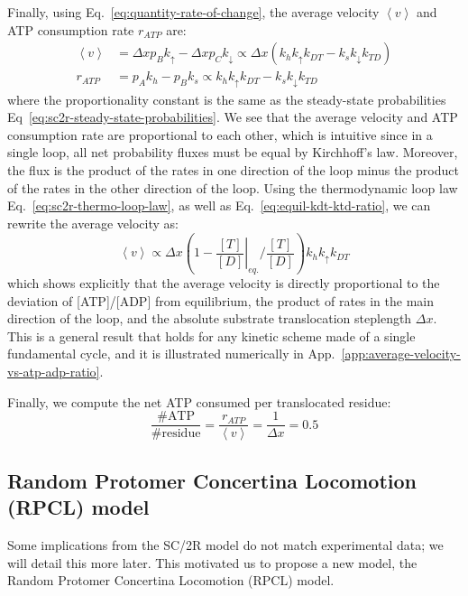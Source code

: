     Finally, using Eq.~\eqref{eq:quantity-rate-of-change}, the average velocity $\left\langle v \right\rangle$ and ATP consumption rate $r_{ATP}$ are:
    \begin{equation}
    \begin{split}
        \left\langle v \right\rangle &= \Delta x p_B k_\uparrow - \Delta x p_C k_\downarrow 
            \propto \Delta x \left(k_h k_\uparrow k_{DT} - k_s k_\downarrow k_{TD}\right) \\
        r_{ATP} &= p_A k_h - p_B k_s
            \propto k_h k_\uparrow k_{DT} - k_s k_\downarrow k_{TD}
    \end{split}
    \end{equation}
    where the proportionality constant is the same as the steady-state probabilities Eq~\eqref{eq:sc2r-steady-state-probabilities}. We see that the average velocity and ATP consumption rate are proportional to each other, which is intuitive since in a single loop, all net probability fluxes must be equal by Kirchhoff's law. Moreover, the flux is the product of the rates in one direction of the loop minus the product of the rates in the other direction of the loop. Using the thermodynamic loop law Eq.~\eqref{eq:sc2r-thermo-loop-law}, as well as Eq.~\eqref{eq:equil-kdt-ktd-ratio}, we can rewrite the average velocity as:
    \begin{equation}
    \label{eq:sc2r-average-velocity}
        \left\langle v \right\rangle \propto \Delta x \left(1 - \left.\frac{[T]}{[D]}\right|_{eq.}\bigg/\frac{[T]}{[D]}\right) k_h k_\uparrow k_{DT}
    \end{equation}
    which shows explicitly that the average velocity is directly proportional to the deviation of [ATP]/[ADP] from equilibrium, the product of rates in the main direction of the loop, and the absolute substrate translocation steplength $\Delta x$. This is a general result that holds for any kinetic scheme made of a single fundamental cycle, and it is illustrated numerically in App.~\ref{app:average-velocity-vs-atp-adp-ratio}. 
    
    Finally, we compute the net ATP consumed per translocated residue:
    \begin{equation}
    \label{eq:sc2r-atp-per-residue}
        \frac{\#\text{ATP}}{\#\text{residue}} = \frac{r_{ATP}}{\left\langle v \right\rangle} = \frac{1}{\Delta x} = 0.5
    \end{equation}

\subsection{Random Protomer Concertina Locomotion (RPCL) model}
\label{subsec:rpcl-model}
    Some implications from the SC/2R model do not match experimental data; we will detail this more later. This motivated us to propose a new model, the Random Protomer Concertina Locomotion (RPCL) model.

